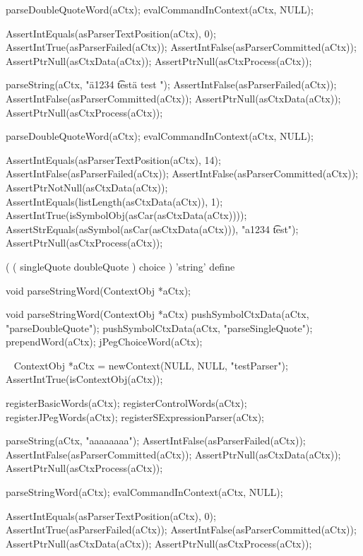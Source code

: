   parseDoubleQuoteWord(aCtx);
  evalCommandInContext(aCtx, NULL);
  
  AssertIntEquals(asParserTextPosition(aCtx), 0);
  AssertIntTrue(asParserFailed(aCtx));
  AssertIntFalse(asParserCommitted(aCtx));
  AssertPtrNull(asCtxData(aCtx));
  AssertPtrNull(asCtxProcess(aCtx));
\stopCTest
\stopTestCase

\startCTest
  parseString(aCtx, "\"a1234 \t test\" a test ");
  AssertIntFalse(asParserFailed(aCtx));
  AssertIntFalse(asParserCommitted(aCtx));
  AssertPtrNull(asCtxData(aCtx));
  AssertPtrNull(asCtxProcess(aCtx));
  
  parseDoubleQuoteWord(aCtx);
  evalCommandInContext(aCtx, NULL);
  
  AssertIntEquals(asParserTextPosition(aCtx), 14);
  AssertIntFalse(asParserFailed(aCtx));
  AssertIntFalse(asParserCommitted(aCtx));
  AssertPtrNotNull(asCtxData(aCtx));
  AssertIntEquals(listLength(asCtxData(aCtx)), 1);
  AssertIntTrue(isSymbolObj(asCar(asCtxData(aCtx))));
  AssertStrEquals(asSymbol(asCar(asCtxData(aCtx))), "a1234 \t test");
  AssertPtrNull(asCtxProcess(aCtx));
\stopCTest
\stopTestCase
\stopTestSuite

\startTestSuite[parseStringWord]

\starttyping
(
  ( singleQuote doubleQuote ) choice
) 'string' define
\stoptyping

\startCHeader
void parseStringWord(ContextObj *aCtx);
\stopCHeader

\startCCode
void parseStringWord(ContextObj *aCtx) {
  pushSymbolCtxData(aCtx, "parseDoubleQuote");
  pushSymbolCtxData(aCtx, "parseSingleQuote");
  prependWord(aCtx);
  jPegChoiceWord(aCtx);
}
\stopCCode

\CTestsSuiteSetup\
\startCTest
  ContextObj *aCtx = newContext(NULL, NULL, "testParser");
  AssertIntTrue(isContextObj(aCtx));
  
  registerBasicWords(aCtx);
  registerControlWords(aCtx);
  registerJPegWords(aCtx);
  registerSExpressionParser(aCtx);
\stopCTest

\startCTest
  parseString(aCtx, "aaaaaaaa");
  AssertIntFalse(asParserFailed(aCtx));
  AssertIntFalse(asParserCommitted(aCtx));
  AssertPtrNull(asCtxData(aCtx));
  AssertPtrNull(asCtxProcess(aCtx));
  
  parseStringWord(aCtx);
  evalCommandInContext(aCtx, NULL);
  
  AssertIntEquals(asParserTextPosition(aCtx), 0);
  AssertIntTrue(asParserFailed(aCtx));
  AssertIntFalse(asParserCommitted(aCtx));
  AssertPtrNull(asCtxData(aCtx));
  AssertPtrNull(asCtxProcess(aCtx));
\stopCTest
\stopTestCase


